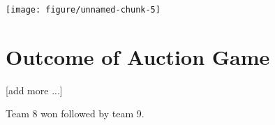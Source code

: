 \documentclass{article}\usepackage[]{graphicx}\usepackage[]{color}
\makeatletter
\def\maxwidth{ %
  \ifdim\Gin@nat@width>\linewidth
    \linewidth
  \else
    \Gin@nat@width
  \fi
}
\newenvironment{knitrout}{}{} %
\makeatother
\begin{document}
\begin{knitrout}
\color{fgcolor}
\texttt{[image: figure/unnamed-chunk-5]} 

\end{knitrout}


\section{Outcome of Auction Game}

[add more ...]

Team 8 won followed by team 9.
\end{document}
